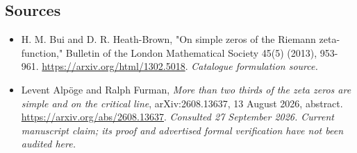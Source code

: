 \documentclass[11pt,a4paper]{article}
\numberwithin{equation}{section}
\begin{document}
\subsection{Sources}
\begin{itemize}\raggedright
\item[\textnormal{[S1]}]\hypertarget{source:171:1}{} H. M. Bui and D. R. Heath-Brown, "On simple zeros of the Riemann zeta-function," Bulletin of the London Mathematical Society 45(5) (2013), 953-961.
\url{https://arxiv.org/html/1302.5018}.
{\small\textit{Catalogue formulation source.}}
\item[\textnormal{[E1]}]\hypertarget{extra:171:1}{} Levent Alp\"oge and
Ralph Furman, \emph{More than two thirds of the zeta zeros are simple and on
the critical line}, arXiv:2608.13637, 13 August 2026, abstract.
\url{https://arxiv.org/abs/2608.13637}.
{\small\textit{Consulted 27 September 2026. Current manuscript claim;
its proof and advertised formal verification have not been audited here.}}
\end{itemize}
\end{document}
